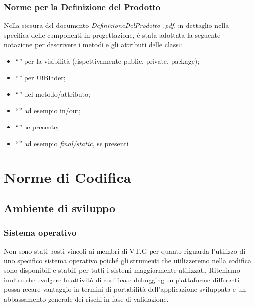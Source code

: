 \subsection{Norme per la Definizione del Prodotto}
Nella stesura del documento \emph{DefinizioneDelProdotto-\versioneDP.pdf}, in
dettaglio nella specifica delle componenti in progettazione, \`e stata adottata
la seguente notazione per descrivere i metodi e gli attributi delle classi:
\begin{itemize}
  \item ``\bo{+, -, \#}'' per la visibilit\`a (rispettivamente public, private,
  package);
  \item ``'' per \underline{UiBinder};
  \item ``'' del metodo/attributo;
  \item ``'' ad esempio in/out;
  \item ``'' se presente;
  \item ``'' ad esempio \emph{final/static}, se presenti.
\end{itemize}


\chapter{Norme di Codifica}
\thispagestyle{fancy} 
\section{Ambiente di sviluppo}

\subsection{Sistema operativo}
Non sono stati posti vincoli ai membri di VT.G per quanto riguarda l'utilizzo di
uno specifico sistema operativo poich\'e gli strumenti che utilizzeremo nella
codifica sono disponibili e stabili per tutti i sistemi maggiormente utilizzati.
Riteniamo inoltre che svolgere le attivit\`a di codifica e debugging su
piattaforme differenti possa recare vantaggio in termini di portabilit\`a
dell'applicazione sviluppata e un abbassamento generale dei rischi in fase di
validazione.


